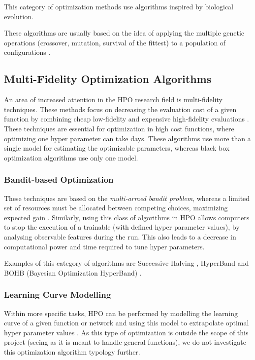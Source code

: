 \documentclass[runningheads]{llncs}
\begin{document}
This category of optimization methods use algorithms inspired by biological evolution.

These algorithms are usually based on the idea of applying the multiple genetic operations (crossover, mutation, survival of the fittest) to a population of configurations \cite{elshawi2019automated}.

\subsection{Multi-Fidelity Optimization Algorithms}

An area of increased attention in the HPO research field is multi-fidelity techniques. These methods focus on decreasing the evaluation cost of a given function by combining cheap low-fidelity and expensive high-fidelity evaluations \cite{elshawi2019automated}. These techniques are essential for optimization in high cost functions, where optimizing one hyper parameter can take days. These algorithms use more than a single model for estimating the optimizable parameters, whereas black box optimization algorithms use only one model.

\subsubsection{Bandit-based Optimization}

These techniques are based on the \textit{multi-armed bandit problem}, whereas a limited set of resources must be allocated between competing choices, maximizing expected gain \cite{Katehakis1987TheMB}. Similarly, using this class of algorithms in HPO allows computers to stop the execution of a trainable (with defined hyper parameter values), by analysing observable features during the run. This also leads to a decrease in computational power and time required to tune hyper parameters.

Examples of this category of algorithms are Successive Halving \cite{jamieson2015nonstochastic}, HyperBand \cite{li2016hyperband} and BOHB (Bayesian Optimization HyperBand) \cite{pmlr-v80-falkner18a}.

\subsubsection{Learning Curve Modelling}

Within more specific tasks, HPO can be performed by modelling the learning curve of a given function or network and using this model to extrapolate optimal hyper parameter values \cite{10555}. As this type of optimization is outside the scope of this project (seeing as it is meant to handle general functions), we do not investigate this optimization algorithm typology further.
\end{document}
